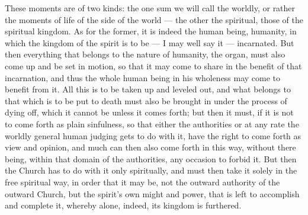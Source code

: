 \documentclass[12pt,a4paper,openany]{book}
\newcommand{\opage}[1]{\marginnote{\footnotesize\textit{[#1]}}}
\begin{document}
\setcounter{footnote}{0}%
\opage{138}These moments are of two kinds: the one sum we will call the worldly, or rather the
moments of life of the side of the world --- the other the spiritual, those of the
spiritual kingdom. As for the former, it is indeed the human being, humanity, in which
the kingdom of the spirit is to be --- I may well say it --- incarnated. But then
everything that belongs to the nature of humanity, the organ, must also come up and
be set in motion, so that it may come to share in the benefit of that incarnation,
and thus the whole human being in his wholeness may come to benefit from it. All this
is to be taken up and leveled out, and what belongs to that which is to be put to
death must also be brought in under the process of dying off, which it cannot be
unless it comes forth; but then it must, if it is not to come forth as plain
sinfulness, so that either the authorities or at any rate the worldly general human
judging gets to do with it, have the right to come forth as view and opinion, and
much can then also come forth in this way, without there being, within that domain of
the authorities, any occasion to forbid it. But then the Church has to do with it
only spiritually, and must then take it solely in the free spiritual way, in order
that it may be, not the outward authority of the outward Church, but the spirit's own
might and power, that is left to accomplish and complete it, whereby alone, indeed,
its kingdom is furthered.
\end{document}
